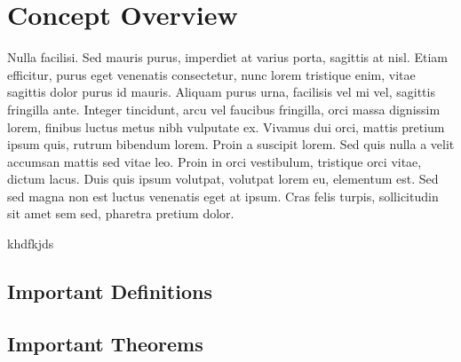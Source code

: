 \documentclass[
10pt, %
a4paper, %
twocolumn, %
landscape %
]{article}
\begin{document}
\section{Concept Overview}

Nulla facilisi. Sed mauris purus, imperdiet at varius porta, sagittis at nisl. Etiam efficitur, purus eget venenatis consectetur, nunc lorem tristique enim, vitae sagittis dolor purus id mauris. Aliquam purus urna, facilisis vel mi vel, sagittis fringilla ante. Integer tincidunt, arcu vel faucibus fringilla, orci massa dignissim lorem, finibus luctus metus nibh vulputate ex. Vivamus dui orci, mattis pretium ipsum quis, rutrum bibendum lorem. Proin a suscipit lorem. Sed quis nulla a velit accumsan mattis sed vitae leo. Proin in orci vestibulum, tristique orci vitae, dictum lacus. Duis quis ipsum volutpat, volutpat lorem eu, elementum est. Sed sed magna non est luctus venenatis eget at ipsum. Cras felis turpis, sollicitudin sit amet sem sed, pharetra pretium dolor.

\vspace{5pt}

\begin{description}
\item khdfkjds
\end{description}

\vspace{7pt}

\subsection{Important Definitions}

\begin{defn}

\end{defn}

\vspace{5pt}

\begin{defn}

\end{defn}

\vspace{7pt}

\subsection{Important Theorems}

\begin{thm}

\end{thm}
\end{document}
